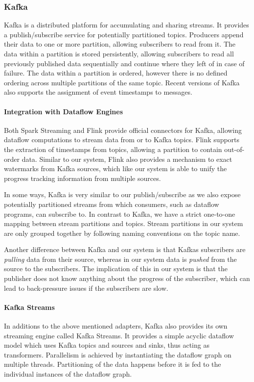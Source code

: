 \subsubsection{Kafka}

Kafka \cite{kafka} is a distributed platform for accumulating and sharing streams. It provides
a publish/subscribe service for potentially partitioned topics. Producers append
their data to one or more partition, allowing subscribers to read from it.
The data within a partition is stored persistently, allowing subscribers to
read all previously published data sequentially and continue where they left
of in case of failure. The data within a partition is ordered, however there
is no defined ordering across multiple partitions of the same topic. Recent
versions of Kafka also supports the assignment of event timestamps to messages.

\paragraph{Integration with Dataflow Engines}

Both Spark Streaming and Flink provide official connectors for Kafka, allowing
dataflow computations to stream data from or to Kafka topics. Flink supports
the extraction of timestamps from topics, allowing a partition
to contain out-of-order data. Similar to our system, Flink also provides a
mechanism to exact watermarks from Kafka sources, which like our system
is able to unify the progress tracking information from multiple sources.

In some ways, Kafka is very similar to our publish/subscribe as we also expose
potentially partitioned streams from which consumers, such as dataflow programs,
can subscribe to. In contrast to Kafka, we have a strict one-to-one mapping between stream
partitions and topics. Stream partitions in our system are only grouped together
by following naming conventions on the topic name. 
 
Another difference between Kafka and our system is that Kafkas subscribers are
\emph{pulling} data from their source, whereas in our system data is \emph{pushed}
from the source to the subscribers. The implication of this in our
system is that the publisher does not know anything about the progress of the
subscriber, which can lead to back-pressure issues if the subscribers are
slow.

\paragraph{Kafka Streams}
In additions to the above mentioned adapters, Kafka also provides its own
streaming engine called Kafka Streams. It provides a simple acyclic dataflow
model which uses Kafka topics and sources and sinks, thus acting as transformers.
Parallelism is achieved by instantiating the dataflow graph on multiple threads.
Partitioning of the data happens before it is fed to the individual instances
of the dataflow graph.

